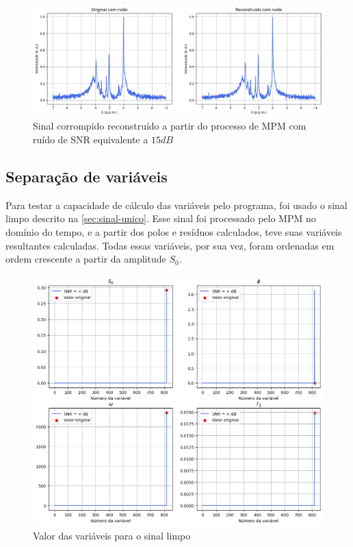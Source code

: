 \documentclass[12pt]{article}
\begin{document}
\begin{figure} [H]
    \includegraphics[scale=0.5]{mpm-com-ruido.png}
    \centering
    \caption{Sinal corrompido reconstruído a partir do processo de MPM com ruído de SNR equivalente a $15 dB$}
    \label{fig:9}
\end{figure}

\subsection{Separação de variáveis}

Para testar a capacidade de cálculo das variáveis pelo programa, foi usado o sinal limpo descrito na \autoref{sec:sinal-unico}. Esse sinal foi processado pelo 
MPM no domínio do tempo, e a partir dos polos e resíduos calculados, teve suas variáveis resultantes calculadas. Todas essas variáveis, por sua vez, foram 
ordenadas em ordem crescente a partir da amplitude $S_0$.

\begin{figure} [H]
    \centering
    \includegraphics[scale=0.4166]{var-0.png}
    \caption{Valor das variáveis para o sinal limpo}
    \label{fig:5}
\end{figure}
\end{document}
